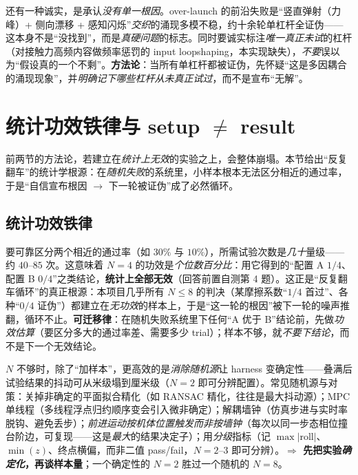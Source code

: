 \begin{insight}\label{ins:ld-emergent}
还有一种诚实，是承认\emph{没有单一根因}。over-launch 的前沿失败是“竖直弹射（力峰）+ 侧向漂移 + 感知闪烁”\emph{交织}的涌现多模不稳，约十余轮单杠杆全证伪——这本身不是“没找到”，而是\emph{真硬问题}的标志。同时要诚实标注\emph{唯一真正未试}的杠杆（对接触力高频内容做频率惩罚的 input loopshaping，本实现缺失），\emph{不要}误以为“假设真的一个不剩”。\textbf{方法论}：当所有单杠杆都被证伪，先怀疑“这是多因耦合的涌现现象”，并\emph{明确记下哪些杠杆从未真正试过}，而不是宣布“无解”。
\end{insight}

\section{统计功效铁律与 setup \texorpdfstring{$\ne$}{!=} result}
\label{sec:ld-power}

前两节的方法论，若建立在\emph{统计上无效}的实验之上，会整体崩塌。本节给出“反复翻车”的统计学根源：在\emph{随机失败}的系统里，小样本根本无法区分相近的通过率，于是“自信宣布根因 $\to$ 下一轮被证伪”成了必然循环。

\subsection{统计功效铁律}
\label{subsec:ld-power-law}

\begin{insight}\label{ins:ld-power}
要可靠区分两个相近的通过率（如 $30\%$ 与 $10\%$），所需试验次数是\emph{几十}量级——约 $40\text{--}85$ 次。这意味着 $N=4$ 的功效是\emph{个位数百分比}：用它得到的“配置 A $1/4$、配置 B $0/4$”之类结论，\textbf{统计上全部无效}（回答前置自测第 4 题）。这正是“反复翻车循环”的真正根源：本项目几乎所有 $N\le 8$ 的判决（某摩擦系数“$1/4$ 首过”、各种“$0/4$ 证伪”）都建立在\emph{无功效}的样本上，于是“这一轮的根因”被下一轮的噪声推翻，循环不止。\textbf{可迁移律}：在随机失败系统里下任何“A 优于 B”结论前，先做\emph{功效估算}（要区分多大的通过率差、需要多少 trial）；样本不够，就\emph{不要下结论}，而不是下一个无效结论。
\end{insight}

\begin{insight}\label{ins:ld-determinize}
$N$ 不够时，除了“加样本”，更高效的是\emph{消除随机源}让 harness 变确定性——叠满后试验结果的抖动可从米级塌到厘米级（$N=2$ 即可分辨配置）。常见随机源与对策：关掉非确定的平面拟合精化（如 RANSAC 精化，往往是最大抖动源）；MPC 单线程（多线程浮点归约顺序变会引入微非确定）；解耦墙钟（仿真步进与实时率脱钩、避免丢步）；\emph{前进运动按机体位置触发而非按墙钟}（每次以同一步态相位撞台阶边，可复现——这是\emph{最大}的结果决定子）；用\emph{分级}指标（记 $\max|\mathrm{roll}|$、$\min(z)$、终点横偏，而非二值 pass/fail，$N=2\text{--}3$ 即可分辨）。\textbf{$\Rightarrow$ 先把实验\emph{确定化}，再谈样本量}；一个确定性的 $N=2$ 胜过一个随机的 $N=8$。
\end{insight}

